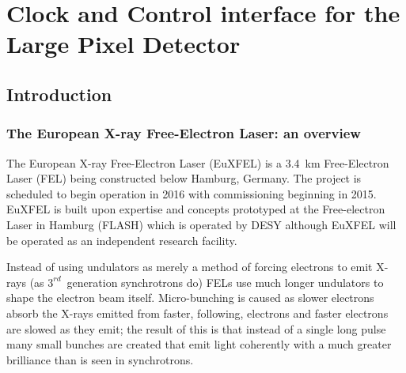 \part{Clock and Control interface for the Large Pixel Detector} %
\label{prt:lpd_ccc_interface}

\chapter{Introduction} %
\label{cha:lpd_ccc_introduction}
\section{The European X-ray Free-Electron Laser: an overview} %
\label{sec:xfel_an_overview}
The European X-ray Free-Electron Laser (EuXFEL) is a 3.4~km Free-Electron Laser (FEL) being constructed below Hamburg, Germany. The project is scheduled to begin operation in 2016 with commissioning beginning in 2015. EuXFEL is built upon expertise and concepts prototyped at the Free-electron Laser in Hamburg (FLASH) which is operated by DESY although EuXFEL will be operated as an independent research facility. 

Instead of using undulators as merely a method of forcing electrons to emit X-rays (as \(3^{rd}\)~generation synchrotrons do) FELs use much longer undulators to shape the electron beam itself. Micro-bunching is caused as slower electrons absorb the X-rays emitted from faster, following, electrons and faster electrons are slowed as they emit; the result of this is that instead of a single long pulse many small bunches are created that emit light coherently with a much greater brilliance than is seen in synchrotrons.

